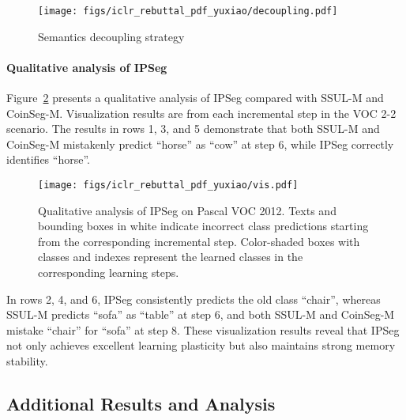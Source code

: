 \begin{figure}[t]
    \centering
    \texttt{[image: figs/iclr\_rebuttal\_pdf\_yuxiao/decoupling.pdf]}
    \caption{Semantics decoupling strategy}
    \label{fig:vis_KD}
    \vspace{-20pt}
\end{figure}




\paragraph{Qualitative analysis of IPSeg} Figure~\ref{fig:vis_main} presents a qualitative analysis of IPSeg compared with SSUL-M and CoinSeg-M. Visualization results are from each incremental step in the VOC 2-2 scenario. The results in rows 1, 3, and 5 demonstrate that both SSUL-M and CoinSeg-M mistakenly predict ``horse'' as ``cow'' at step 6, while IPSeg correctly identifies ``horse''. 


\begin{figure}[H]
    \centering
    \texttt{[image: figs/iclr\_rebuttal\_pdf\_yuxiao/vis.pdf]}
    \caption{Qualitative analysis of IPSeg on Pascal VOC 2012. Texts and bounding boxes in white indicate incorrect class predictions starting from the corresponding incremental step. Color-shaded boxes with classes and indexes represent the learned classes in the corresponding learning steps.}
    \label{fig:vis_main}
    \vspace{-5pt}
\end{figure}

\vspace{-10pt}
In rows 2, 4, and 6, IPSeg consistently predicts the old class ``chair'', whereas SSUL-M predicts ``sofa'' as ``table'' at step 6, and both SSUL-M and CoinSeg-M mistake ``chair'' for ``sofa'' at step 8. These visualization results reveal that IPSeg not only achieves excellent learning plasticity but also maintains strong memory stability.


















\subsection{Additional Results and Analysis}


